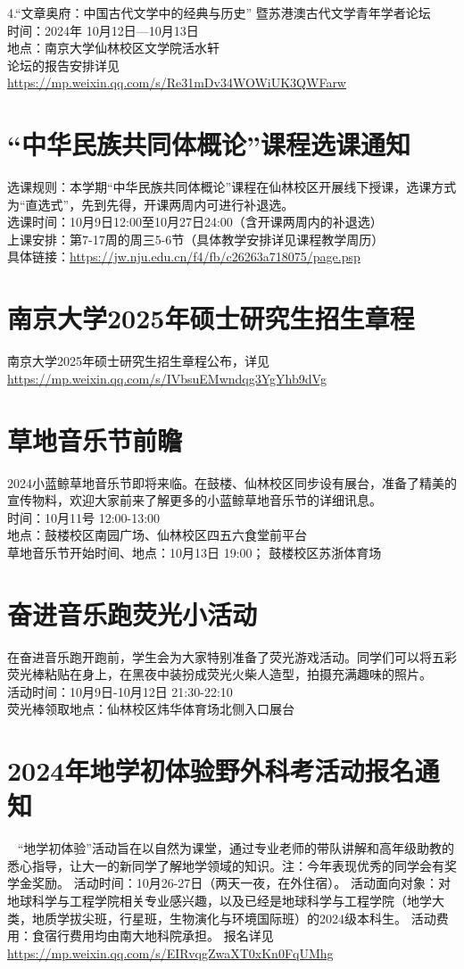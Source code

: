 \documentclass[letterpaper, 12pt]{article}
\begin{document}
\begin{multicols}{2}
4.“文章奥府：中国古代文学中的经典与历史” 暨苏港澳古代文学青年学者论坛\\
时间：2024年 10月12日—10月13日\\
地点：南京大学仙林校区文学院活水轩\\
论坛的报告安排详见\url{https://mp.weixin.qq.com/s/Re31mDv34WOWiUK3QWFarw}
\section{“中华民族共同体概论”课程选课通知}
选课规则：本学期“中华民族共同体概论”课程在仙林校区开展线下授课，选课方式为“直选式”，先到先得，开课两周内可进行补退选。\\
选课时间：10月9日12:00至10月27日24:00（含开课两周内的补退选）\\
上课安排：第7-17周的周三5-6节（具体教学安排详见课程教学周历）\\
具体链接：\url{https://jw.nju.edu.cn/f4/fb/c26263a718075/page.psp}
\section{南京大学2025年硕士研究生招生章程}
南京大学2025年硕士研究生招生章程公布，详见\url{https://mp.weixin.qq.com/s/IVbsuEMwndqg3YgYhb9dVg}
\section{草地音乐节前瞻}
2024小蓝鲸草地音乐节即将来临。在鼓楼、仙林校区同步设有展台，准备了精美的宣传物料，欢迎大家前来了解更多的小蓝鲸草地音乐节的详细讯息。\\
时间：10月11号 12:00-13:00\\
地点：鼓楼校区南园广场、仙林校区四五六食堂前平台\\
草地音乐节开始时间、地点：10月13日 19:00； 鼓楼校区苏浙体育场
\section{奋进音乐跑荧光小活动}
在奋进音乐跑开跑前，学生会为大家特别准备了荧光游戏活动。同学们可以将五彩荧光棒粘贴在身上，在黑夜中装扮成荧光火柴人造型，拍摄充满趣味的照片。\\
活动时间：10月9日-10月12日 21:30-22:10\\
荧光棒领取地点：仙林校区炜华体育场北侧入口展台
\section{2024年地学初体验野外科考活动报名通知} 
“地学初体验”活动旨在以自然为课堂，通过专业老师的带队讲解和高年级助教的悉心指导，让大一的新同学了解地学领域的知识。注：今年表现优秀的同学会有奖学金奖励。
活动时间：10月26-27日（两天一夜，在外住宿）。
活动面向对象：对地球科学与工程学院相关专业感兴趣，以及已经是地球科学与工程学院（地学大类，地质学拔尖班，行星班，生物演化与环境国际班）的2024级本科生。
活动费用：食宿行费用均由南大地科院承担。
报名详见\url{https://mp.weixin.qq.com/s/EIRvqgZwaXT0xKn0FqUMhg}

\end{multicols}
\end{document}
